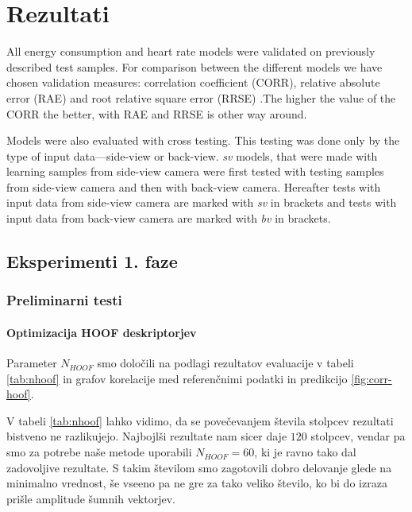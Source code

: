 \chapter{Rezultati}\label{sec:rezultati}
All energy consumption and heart rate models were validated on previously described test samples. For comparison between the different models we have chosen validation measures: correlation coefficient (CORR), relative absolute error (RAE) and root relative square error (RRSE) \cite{witten2005data}.The higher the value of the CORR the better, with RAE and RRSE is other way around.

Models were also evaluated with cross testing. This testing was done only by the type of input data---side-view or back-view. \textit{sv} models, that were made with learning samples from side-view camera were first tested with testing samples from side-view camera and then with back-view camera. Hereafter tests with input data from side-view camera are marked with \textit{sv} in brackets and tests with input data from back-view camera are marked with \textit{bv} in brackets.



















\section{Eksperimenti 1. faze}


\subsection{Preliminarni testi}

\subsubsection{Optimizacija HOOF deskriptorjev}\label{sec:rezultati-optimizacija-hoof}
Parameter $N_{HOOF}$ smo določili na podlagi rezultatov evaluacije v tabeli \ref{tab:nhoof} in grafov korelacije med referenčnimi podatki in predikcijo \ref{fig:corr-hoof}.

V tabeli \ref{tab:nhoof} lahko vidimo, da se povečevanjem števila stolpcev rezultati bistveno ne razlikujejo. Najbojlši rezultate nam sicer daje $120$ stolpcev, vendar pa smo za potrebe naše metode uporabili $N_{HOOF}=60$, ki je ravno tako dal zadovoljive rezultate. S takim številom smo zagotovili dobro delovanje glede na minimalno vrednost, še vseeno pa ne gre za tako veliko število, ko bi do izraza prišle amplitude šumnih vektorjev.

